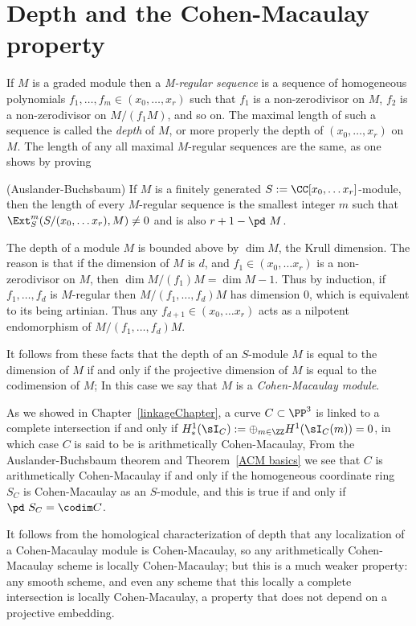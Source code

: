 \section{Depth and the Cohen-Macaulay property}

If $M$ is a graded module then a \emph{M-regular sequence} is a sequence of homogeneous polynomials
$f_1,\dots,f_m \in (x_0,\dots, x_r)$ such that $f_1$ is a non-zerodivisor on $M$, $f_2$ is a non-zerodivisor on $M/(f_1M)$, and so on. 
The maximal length of such a sequence is called the \emph{depth} of $M$, or more properly the depth of $(x_0,\dots, x_r)$ on $M$.
The length of any all maximal $M$-regular sequences are the same, as one shows by proving

\begin{theorem} (Auslander-Buchsbaum)\label{Auslander-Buchsbaum}
If $M$ is a finitely generated $S := \CC[x_0, \dots x_r]$-module, then the length of every $M$-regular sequence is
the smallest integer $m$ such that $\Ext_S^m(S/(x_0, \dots x_r), M) \neq 0$ and is also $r+1 - \pd\  M$.
\end{theorem}
 
 The depth of a module $M$ is bounded above by $\dim M$, the Krull dimension. The reason is that if the dimension of $M$
 is $d$, and $f_1 \in (x_0, \dots x_r) $ is a non-zerodivisor on $M$, then $\dim M/(f_1)M= \dim M-1$. Thus by induction, if
  $f_1,\dots, f_d$ is $M$-regular then $M/(f_1, \dots, f_d)M$ has dimension 0, which is equivalent to its being artinian. Thus any 
$ f_{d+1} \in(x_0, \dots x_r) $ acts as a nilpotent endomorphism of $M/(f_1, \dots, f_d)M$.

It follows from these facts that the depth of an $S$-module $M$ is equal to the dimension of $M$ if and only if the projective dimension
of $M$ is equal to the codimension of $M$; In this case we say that $M$ is a
\emph{Cohen-Macaulay module}. 

As we showed in Chapter~\ref{linkageChapter}, a curve $C\subset \PP^3$ is linked to a complete intersection
if and only if  $H^1_*(\sI_C) := \oplus_{m\in \ZZ} H^1(\sI_C(m)) = 0$, in which case $C$ is said to be is arithmetically Cohen-Macaulay,
From the Auslander-Buchsbaum theorem and Theorem~\ref{ACM basics} we see that $C$ is arithmetically Cohen-Macaulay if
and only if the homogeneous coordinate ring $S_C$ is Cohen-Macaulay as an $S$-module, and this is true
if and only if $\pd\  S_C = \codim C$.

It follows from the homological characterization of depth that any localization of a Cohen-Macaulay module is Cohen-Macaulay,
so any arithmetically Cohen-Macaulay scheme is locally Cohen-Macaulay; but this is a much weaker property: any smooth
scheme, and even any scheme that this locally a complete intersection is locally Cohen-Macaulay, a property that does
not depend on a projective embedding.


